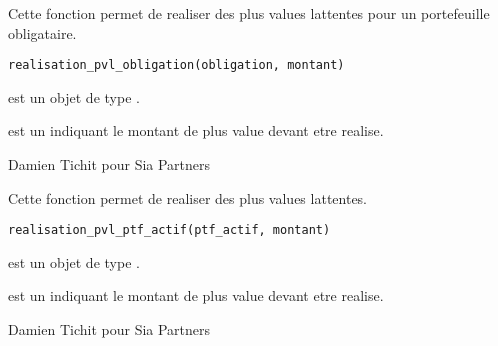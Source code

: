 \documentclass[a4paper]{book}
\begin{document}
%
\begin{Description}\relax
Cette fonction permet de realiser des plus values lattentes pour un portefeuille obligataire.
\end{Description}
%
\begin{Usage}
\begin{verbatim}
realisation_pvl_obligation(obligation, montant)
\end{verbatim}
\end{Usage}
%
\begin{Arguments}
\begin{ldescription}
\item[\code{obligation}] est un objet de type .

\item[\code{montant}] est un  indiquant le montant de plus value devant etre realise.
\end{ldescription}
\end{Arguments}
%
\begin{Author}\relax
Damien Tichit pour Sia Partners
\end{Author}
%
\begin{Description}\relax
Cette fonction permet de realiser des plus values lattentes.
\end{Description}
%
\begin{Usage}
\begin{verbatim}
realisation_pvl_ptf_actif(ptf_actif, montant)
\end{verbatim}
\end{Usage}
%
\begin{Arguments}
\begin{ldescription}
\item[\code{ptf\_actif}] est un objet de type .

\item[\code{montant}] est un  indiquant le montant de plus value devant etre realise.
\end{ldescription}
\end{Arguments}
%
\begin{Author}\relax
Damien Tichit pour Sia Partners
\end{Author}
\end{document}
